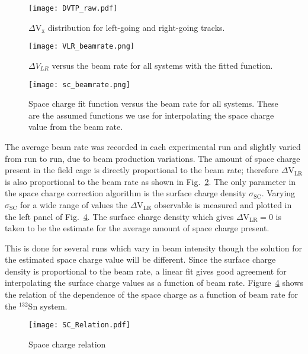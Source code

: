 \begin{figure}[!htb]
\centering
\texttt{[image: DVTP\_raw.pdf]}
\caption{$\Delta\mathrm{V}_\mathrm{x}$ distribution for left-going and right-going tracks. }
\label{fig:VLR}
\end{figure}



\begin{figure}[!htb]
\centering
\texttt{[image: VLR\_beamrate.png]}
\caption{ $\Delta V_{LR}$ versus the beam rate for all systems with the fitted function.}
\label{fig:VLR_br}
\end{figure}



\begin{figure}[!htb]
\centering
\texttt{[image: sc\_beamrate.png]}
\caption{Space charge fit function versus the beam rate for all systems. These are the assumed functions we use for interpolating the space charge value from the beam rate.}
\label{fig:spacechg_br_all}
\end{figure}

The average beam rate was recorded in each experimental run and slightly varied from run to run, due to beam production variations. The amount of space charge present in the field cage is directly proportional to the beam rate; therefore $\Delta\mathrm{V}_\mathrm{LR}$ is also proportional to the beam rate as shown in Fig.~\ref{fig:VLR_br}. The only parameter in the space charge correction algorithm is the surface charge density $\sigma_{\mathrm{SC}}$. Varying $\sigma_{\mathrm{SC}}$ for a wide range of values the $\Delta\mathrm{V}_\mathrm{LR}$ observable is measured and plotted in the left panel of Fig.~\ref{fig:spacechg_relation}. The surface charge density which gives $\Delta\mathrm{V}_\mathrm{LR} = 0$ is taken to be the estimate for the average amount of space charge present. 

This is done for several runs which vary in beam intensity though the solution for the estimated space charge value will be different. Since the surface charge density is proportional to the beam rate, a linear fit gives good agreement for interpolating the surface charge values as a function of beam rate. Figure~\ref{fig:spacechg_relation} shows the relation of the dependence of the space charge as a function of beam rate for the ${}^{132}$Sn system.

\begin{figure}[!htb]
\texttt{[image: SC\_Relation.pdf]}
\caption{Space charge relation}
\label{fig:spacechg_relation}
\end{figure}


